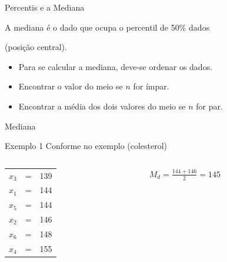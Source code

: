 \documentclass{beamer}
\begin{document}
\begin{frame}{\scriptsize Percentis e a Mediana}
  \begin{block}{}
    \footnotesize
    A mediana é o dado que ocupa o percentil de 50\% dados

    (\alert{posição central}).
  \end{block}
  \bigskip
  \begin{itemize}
    \footnotesize
  \item Para se calcular a mediana, deve-se ordenar os dados.
  \item Encontrar o valor do \alert{meio} se $n$ for ímpar.
  \item Encontrar a média dos dois valores do \alert{meio} se $n$ for par.
  \end{itemize}
\end{frame}

\begin{frame}{\scriptsize Mediana}
  \begin{exampleblock}{Exemplo 1}
    \footnotesize
    Conforme no exemplo (colesterol)
    \bigskip
    \tiny
    \begin{columns}
      \begin{column}{5cm}
        \begin{tabular}{ccc}
          $x_3$ &=&139\\
          $x_1$ &=&144\\
          $x_5$ &=&\alert{144}\\
          $x_2$ &=&\alert{146}\\
          $x_6$ &=&148\\
          $x_4$ &=&155\\
        \end{tabular}
      \end{column}
      \begin{column}{5cm}
        \scriptsize
        $M_d = \frac{144+146}{2}=145$
      \end{column}
    \end{columns}
  \end{exampleblock}
\end{frame}
\end{document}
